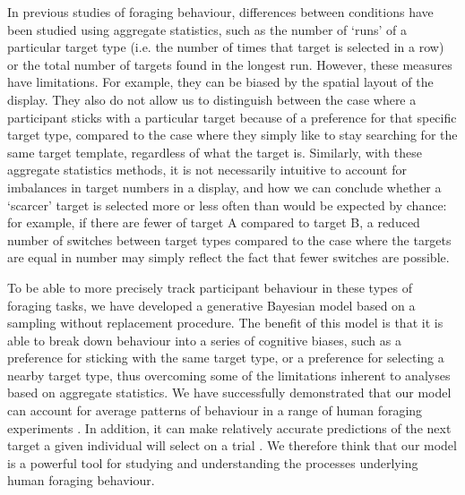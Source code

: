 \documentclass[12pt]{article}
\begin{document}
In previous studies of foraging behaviour, differences between conditions have been studied using aggregate statistics, such as the number of `runs' of a particular target type (i.e. the number of times that target is selected in a row) or the total number of targets found in the longest run. However, these measures have limitations. For example, they can be biased by the spatial layout of the display. They also do not allow us to distinguish between the case where a participant sticks with a particular target because of a preference for that specific target type, compared to the case where they simply like to stay searching for the same target template, regardless of what the target is. Similarly, with these aggregate statistics methods, it is not necessarily intuitive to account for imbalances in target numbers in a display, and how we can conclude whether a `scarcer' target is selected more or less often than would be expected by chance: for example, if there are fewer of target A compared to target B, a reduced number of switches between target types compared to the case where the targets are equal in number may simply reflect the fact that fewer switches are possible.

To be able to more precisely track participant behaviour in these types of foraging tasks, we have developed a generative Bayesian model based on a sampling without replacement procedure. The benefit of this model is that it is able to break down behaviour into a series of cognitive biases, such as a preference for sticking with the same target type, or a preference for selecting a nearby target type, thus overcoming some of the limitations inherent to analyses based on aggregate statistics. We have successfully demonstrated that our model can account for average patterns of behaviour in a range of human foraging experiments \citep{clarke2022foraging}. In addition, it can make relatively accurate predictions of the next target a given individual will select on a trial \citep{clarke2022bayesian}. We therefore think that our model is a powerful tool for studying and understanding the processes underlying human foraging behaviour.
\end{document}
